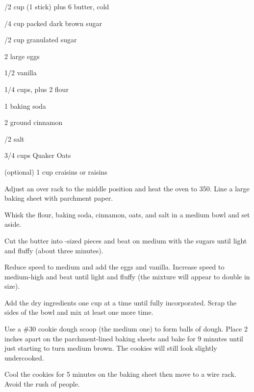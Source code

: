 %
%
%
%
\newpage




\begin{IngredientsAndSteps}
    \ListIngredientsAndSteps
    {
        /2 cup (1 stick) plus 6 \Tbl[s] butter, cold

        /4 cup packed dark brown sugar

        /2 cup granulated sugar

        2 large eggs

        1/2 \tsp[s] vanilla

        1/4 cups, plus 2 \Tbl[s] flour

        1 \tsp baking soda

        2 \tsp[s] ground cinnamon

        /2 \tsp salt

        3/4 cups Quaker Oats

        (optional) 1 cup craisins or raisins
    }
    {
        Adjust an over rack to the middle position and heat the oven to 350\Degrees[F]. Line a large baking sheet
        with parchment paper.

        Whisk the flour, baking soda, cinnamon, oats, and salt in a medium bowl and set aside.

        Cut the butter into \Tbl-sized pieces and beat on medium with the sugars until light and fluffy
        (about three minutes).

        Reduce speed to medium and add the eggs and vanilla. Increase speed to medium-high and beat until
        light and fluffy (the mixture will appear to double in size).

        Add the dry ingredients one cup at a time until fully incorporated. Scrap the sides of the
        bowl and mix at least one more time.

        Use a \#30 cookie dough scoop (the medium one) to form balls of dough.
        Place 2 inches apart on the parchment-lined baking sheets and bake for 9 minutes until just starting
        to turn medium brown. The cookies will still look slightly undercooked.

        Cool the cookies for 5 minutes on the baking sheet then move to a wire rack. Avoid the rush of people.
    }
\end{IngredientsAndSteps}

